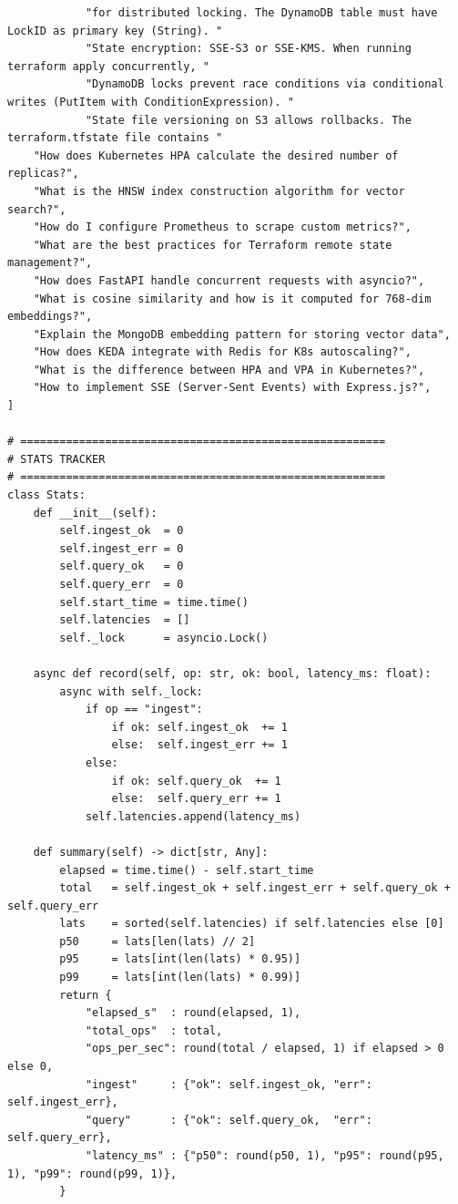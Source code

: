 \documentclass[12pt,a4paper]{report}
\begin{document}
\begin{lstlisting}
            "for distributed locking. The DynamoDB table must have LockID as primary key (String). "
            "State encryption: SSE-S3 or SSE-KMS. When running terraform apply concurrently, "
            "DynamoDB locks prevent race conditions via conditional writes (PutItem with ConditionExpression). "
            "State file versioning on S3 allows rollbacks. The terraform.tfstate file contains "
    "How does Kubernetes HPA calculate the desired number of replicas?",
    "What is the HNSW index construction algorithm for vector search?",
    "How do I configure Prometheus to scrape custom metrics?",
    "What are the best practices for Terraform remote state management?",
    "How does FastAPI handle concurrent requests with asyncio?",
    "What is cosine similarity and how is it computed for 768-dim embeddings?",
    "Explain the MongoDB embedding pattern for storing vector data",
    "How does KEDA integrate with Redis for K8s autoscaling?",
    "What is the difference between HPA and VPA in Kubernetes?",
    "How to implement SSE (Server-Sent Events) with Express.js?",
]

# ========================================================
# STATS TRACKER
# ========================================================
class Stats:
    def __init__(self):
        self.ingest_ok  = 0
        self.ingest_err = 0
        self.query_ok   = 0
        self.query_err  = 0
        self.start_time = time.time()
        self.latencies  = []
        self._lock      = asyncio.Lock()

    async def record(self, op: str, ok: bool, latency_ms: float):
        async with self._lock:
            if op == "ingest":
                if ok: self.ingest_ok  += 1
                else:  self.ingest_err += 1
            else:
                if ok: self.query_ok  += 1
                else:  self.query_err += 1
            self.latencies.append(latency_ms)

    def summary(self) -> dict[str, Any]:
        elapsed = time.time() - self.start_time
        total   = self.ingest_ok + self.ingest_err + self.query_ok + self.query_err
        lats    = sorted(self.latencies) if self.latencies else [0]
        p50     = lats[len(lats) // 2]
        p95     = lats[int(len(lats) * 0.95)]
        p99     = lats[int(len(lats) * 0.99)]
        return {
            "elapsed_s"  : round(elapsed, 1),
            "total_ops"  : total,
            "ops_per_sec": round(total / elapsed, 1) if elapsed > 0 else 0,
            "ingest"     : {"ok": self.ingest_ok, "err": self.ingest_err},
            "query"      : {"ok": self.query_ok,  "err": self.query_err},
            "latency_ms" : {"p50": round(p50, 1), "p95": round(p95, 1), "p99": round(p99, 1)},
        }



\end{lstlisting}
\end{document}
